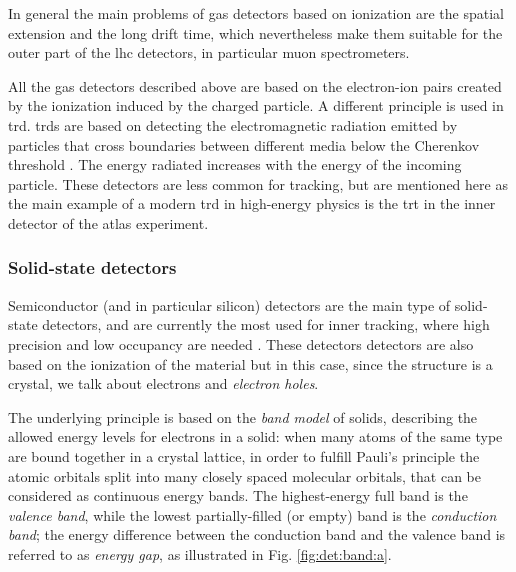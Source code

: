 In general the main problems of gas detectors based on ionization are the spatial extension and the long drift time, 
which nevertheless make them suitable for the outer part of the \gls{lhc} detectors, in particular muon spectrometers.

All the gas detectors described above are based on the electron-ion pairs created by the ionization induced by the charged particle. A different principle is used in \gls{trd}. \glspl{trd} are based on detecting the electromagnetic radiation emitted by particles that cross boundaries between different media below the Cherenkov threshold \cite{1402-4896-1982-T2A-024}. The energy radiated increases with the energy of the incoming particle. These detectors are less common for tracking, but are mentioned here as the main example of a modern \gls{trd} in high-energy physics is the \gls{trt} in the inner detector of the \gls{atlas} experiment.

\subsubsection*{Solid-state detectors}

Semiconductor (and in particular silicon) detectors are the main type of solid-state detectors, and are currently the most used for inner tracking, 
where high precision and low occupancy are needed \cite{Hartmann:2009zza}. 
These detectors detectors are also based on the ionization of the material but in this case, since the structure is a crystal, 
we talk about electrons and \textit{electron holes}. 

The underlying principle is based on the \textit{band model} of solids, describing the allowed energy levels for electrons in a solid: when many atoms of the same type are bound together in a crystal lattice, in order to fulfill Pauli's principle the atomic orbitals split into many closely spaced molecular orbitals, that can be considered as continuous energy bands. The highest-energy full band is the \textit{valence band}, while the lowest partially-filled (or empty) band is the \textit{conduction band}; the energy difference between the conduction band and the valence band is referred to as \textit{energy gap}, as illustrated in Fig. \ref{fig:det:band:a}. 

